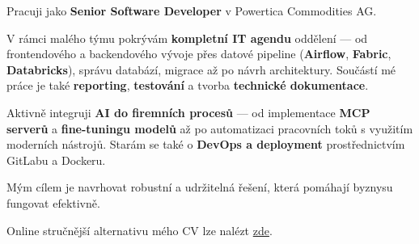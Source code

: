 \documentclass[cv_cz.tex]{subfiles}
\begin{document}

\newcommand\minitab[2][l]{\begin{tabular}[b]{#1}#2\end{tabular}}
\newcommand\tnode[2][left]{\tikz[baseline=(n.center)]\node(n)[inner sep=0,outer sep=0,align=#1]{#2};}
\newcommand*{\cventrylogo}[8][.25em]{
  \begin{tabular*}{\textwidth}{l@{\extracolsep{\fill}}r}%
    \tnode{\minitab[l]{
      {\bfseries #4} \\ {\itshape #3\ifthenelse{\equal{#7}{}}{}{, #7}}
    }}
    & 
    \tnode[right]{\minitab[r]{{\bfseries #6} \\ {\itshape #2} \\ #5}} 
      \\%
  \end{tabular*}%
  \ifx&#8&%
    \else{\\\vbox{\small#8}}\fi%
  \par\addvspace{#1}}


\vspace*{-8mm}

Pracuji jako \textbf{Senior Software Developer} v Powertica Commodities AG. \\
\vspace*{-3mm}

V rámci malého týmu pokrývám \textbf{kompletní IT agendu} oddělení — od frontendového a backendového vývoje přes datové pipeline (\textbf{Airflow}, \textbf{Fabric}, \textbf{Databricks}), správu databází, migrace až po návrh architektury. Součástí mé práce je také \textbf{reporting}, \textbf{testování} a tvorba \textbf{technické dokumentace}. \\
\vspace*{-3mm}

Aktivně integruji \textbf{AI do firemních procesů} — od implementace \textbf{MCP serverů} a \textbf{fine-tuningu modelů} až po automatizaci pracovních toků s využitím moderních nástrojů. Starám se také o \textbf{DevOps a deployment} prostřednictvím GitLabu a Dockeru. \\
\vspace*{-3mm}

Mým cílem je navrhovat robustní a udržitelná řešení, která pomáhají byznysu fungovat efektivně. \\
\vspace*{-3mm}

Online stručnější alternativu mého CV lze nalézt \href{https://cv.dominik-97.cloud}{\color[RGB]{69,114,174}zde}.
\end{document}
